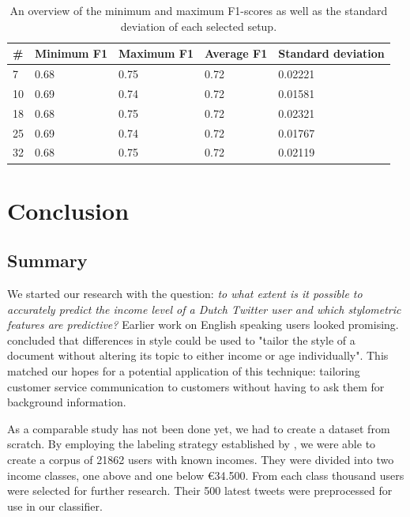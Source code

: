 \documentclass[
10pt, %
a4paper, %
oneside, %
headinclude,footinclude, %
] {book}%
\begin{document}
\begin{table}[]
\caption{An overview of the minimum and maximum F1-scores as well as the standard deviation of each selected setup.}
\label{standarddev}
\begin{tabular}{@{}lllll@{}}
\toprule
\textbf{\#} & \textbf{Minimum F1} & \textbf{Maximum F1} & \textbf{Average F1} & \textbf{Standard deviation} \\ \midrule
7                    & 0.68             & 0.75             & 0.72             & 0.02221                     \\
10                   & 0.69             & 0.74             & 0.72             & 0.01581                     \\
18                   & 0.68             & 0.75             & 0.72             & 0.02321                    \\
25                   & 0.69             & 0.74             & 0.72             & 0.01767                     \\
32                   & 0.68             & 0.75             & 0.72             & 0.02119                     \\ \bottomrule
\end{tabular}
\end{table}

\chapter{Conclusion}
\label{conclusion}
\section{Summary}
We started our research with the question: \textit{to what extent is it possible to accurately predict the income level of a Dutch Twitter user and which stylometric features are predictive?} Earlier work on English speaking users looked promising. \citet{flekova} concluded that differences in style could be used to "tailor the style of a document without altering its topic to either income or age individually". This matched our hopes for a potential application of this technique: tailoring customer service communication to customers without having to ask them for background information.

As a comparable study has not been done yet, we had to create a dataset from scratch. By employing the labeling strategy established by \citet{sloan}, we were able to create a corpus of 21862 users with known incomes. They were divided into two income classes, one above and one below \euro 34.500. From each class thousand users were selected for further research. Their 500 latest tweets were preprocessed for use in our classifier.
\end{document}
